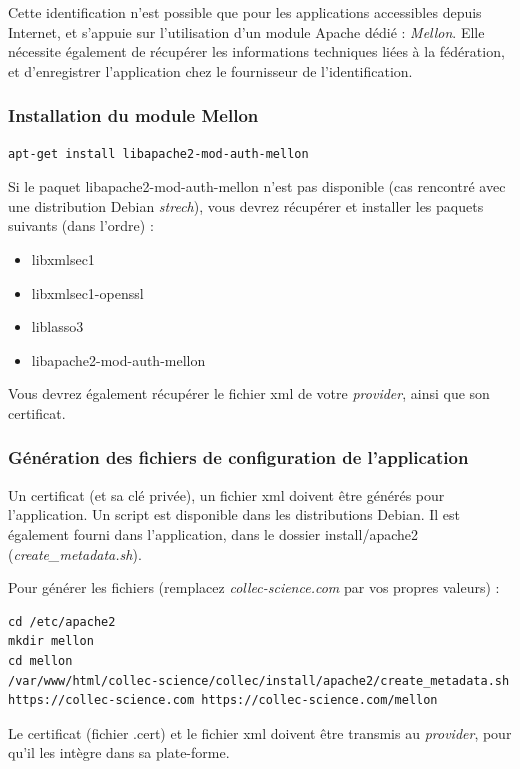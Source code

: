 Cette identification n'est possible que pour les applications accessibles depuis Internet, et s'appuie sur l'utilisation d'un module Apache dédié : \textit{Mellon}. Elle nécessite également de récupérer les informations techniques liées à la fédération, et d'enregistrer l'application chez le fournisseur de l'identification.

\subsubsection{Installation du module Mellon}
\begin{lstlisting}
apt-get install libapache2-mod-auth-mellon
\end{lstlisting}

Si le paquet libapache2-mod-auth-mellon n'est pas disponible (cas rencontré avec une distribution Debian \textit{strech}), vous devrez récupérer et installer les paquets suivants (dans l'ordre) :
\begin{itemize}
	\item libxmlsec1
	\item libxmlsec1-openssl
	\item liblasso3
	\item libapache2-mod-auth-mellon
\end{itemize}

Vous devrez également récupérer le fichier xml de votre \textit{provider}, ainsi que son certificat.

\subsubsection{Génération des fichiers de configuration de l'application}
Un certificat (et sa clé privée), un fichier xml doivent être générés pour l'application. Un script est disponible dans les distributions Debian. Il est également fourni dans l'application, dans le dossier install/apache2 (\textit{create\_metadata.sh}).

Pour générer les fichiers (remplacez \textit{collec-science.com} par vos propres valeurs) : 
\begin{lstlisting}
cd /etc/apache2
mkdir mellon
cd mellon
/var/www/html/collec-science/collec/install/apache2/create_metadata.sh https://collec-science.com https://collec-science.com/mellon
\end{lstlisting}

Le certificat (fichier .cert) et le fichier xml doivent être transmis au \textit{provider}, pour qu'il les intègre dans sa plate-forme.


